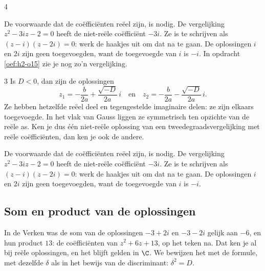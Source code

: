 \begin{alleenvoor}{4}

De voorwaarde dat de coëfficiënten reëel zijn, is nodig. De vergelijking $z^2 - 3iz - 2 = 0$ heeft de niet-reële coëfficiënt $-3i$. Ze is te schrijven als $(z - i)(z - 2i) = 0$: werk de haakjes uit om dat na te gaan. De oplossingen $i$ en $2i$ zijn geen toegevoegden, want de toegevoegde van $i$ is $-i$. In opdracht \ref{oef:h2-o15} zie je nog zo'n vergelijking.

\end{alleenvoor}
\begin{alleenvoor}{3}
Is $D < 0$, dan zijn de oplossingen
\[ z_1 = -\frac{b}{2a} + \frac{\sqrt{-D}}{2a}\,i \quad \text{en} \quad z_2 = -\frac{b}{2a} - \frac{\sqrt{-D}}{2a}\,i . \]
Ze hebben hetzelfde reëel deel en tegengestelde imaginaire delen: ze zijn elkaars toegevoegde. In het vlak van Gauss liggen ze symmetrisch ten opzichte van de reële as. Ken je dus één niet-reële oplossing van een tweedegraadsvergelijking met reële coëfficiënten, dan ken je ook de andere.

De voorwaarde dat de coëfficiënten reëel zijn, is nodig. De vergelijking $z^2 - 3iz - 2 = 0$ heeft de niet-reële coëfficiënt $-3i$. Ze is te schrijven als $(z - i)(z - 2i) = 0$: werk de haakjes uit om dat na te gaan. De oplossingen $i$ en $2i$ zijn geen toegevoegden, want de toegevoegde van $i$ is $-i$.

\end{alleenvoor}
\subsection{Som en product van de oplossingen}

In de Verken was de som van de oplossingen $-3 + 2i$ en $-3 - 2i$ gelijk aan $-6$, en hun product $13$: de coëfficiënten van $z^2 + 6z + 13$, op het teken na. Dat ken je al bij reële oplossingen, en het blijft gelden in $\C$. We bewijzen het met de formule, met dezelfde $\delta$ als in het bewijs van de discriminant: $\delta^2 = D$.

